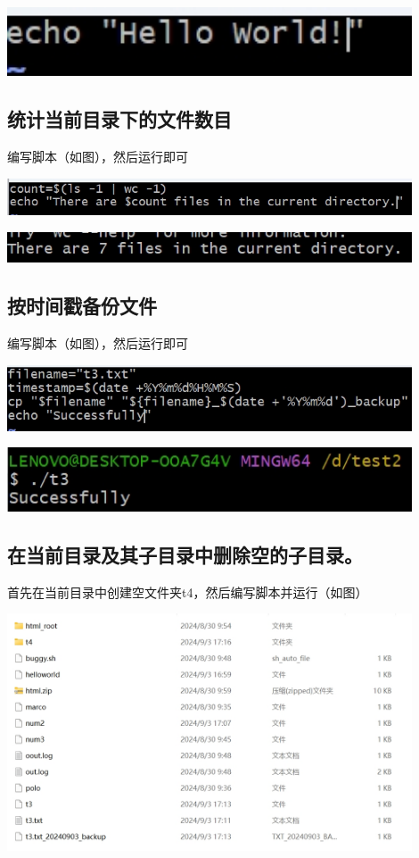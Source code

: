 \documentclass[UTF8,a4paper]{ctexart}
\begin{document}
\begin{sloppypar}
	\includegraphics[width = 12cm]{20}
	
	\subsection{统计当前目录下的文件数目}
	编写脚本（如图），然后运行即可
	
	\includegraphics[width = 12cm]{21}
	
	\includegraphics[width = 12cm]{22}
	
	\subsection{按时间戳备份文件}
	编写脚本（如图），然后运行即可
	
	\includegraphics[width = 12cm]{23}
	
	\includegraphics[width = 12cm]{24}
	
	\subsection{在当前目录及其子目录中删除空的子目录。}
	首先在当前目录中创建空文件夹t4，然后编写脚本并运行（如图）
	
	\includegraphics[width = 12cm]{25}
	

\end{sloppypar}
\end{document}
